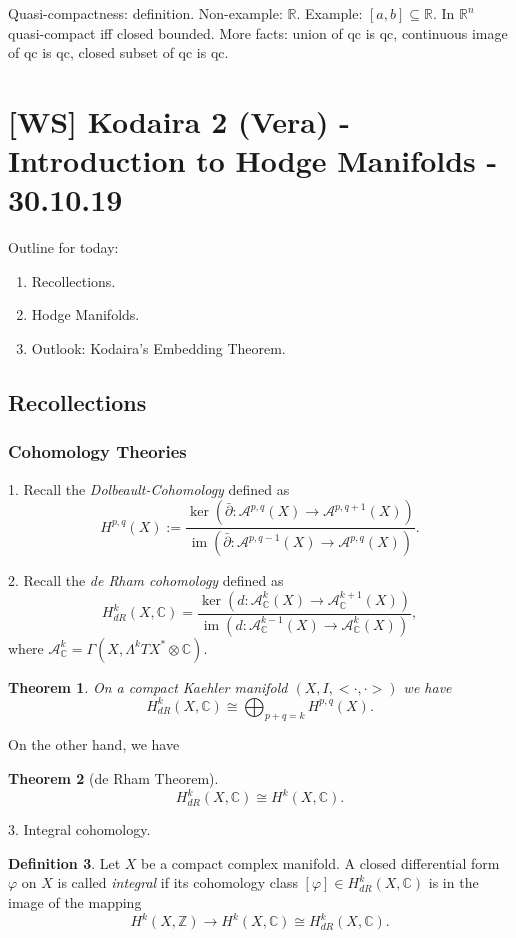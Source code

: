 \documentclass[11pt,A4]{article}
\theoremstyle{plain}
\newtheorem{thm}{Theorem}[section]
\theoremstyle{definition}
\newtheorem{defn}[thm]{Definition}
\theoremstyle{remark}
\newcommand{\Z}{\mathbb{Z}}
\newcommand{\R}{\mathbb{R}}
\newcommand{\1}{\mathbbm{1}}
\newcommand{\C}{\mathbb{C}}
\newcommand{\A}{\mathscr{A}}
\DeclareMathOperator{\im}{im}
\newcommand{\ot}{\otimes}
\begin{document}
Quasi-compactness: definition.
Non-example: $\R$.
Example: $[a,b]\subseteq \R$.
In $\R^{n}$ quasi-compact iff closed bounded.
More facts: union of qc is qc, continuous image of qc is qc, closed subset of qc is qc.

\section{[WS] Kodaira 2 (Vera) - Introduction to Hodge Manifolds - 30.10.19}

Outline for today:
\begin{enumerate}[label=\arabic*)]
    \item Recollections.
    \item Hodge Manifolds.
    \item Outlook: Kodaira's Embedding Theorem.
\end{enumerate}

\subsection{Recollections}

\subsubsection{Cohomology Theories}

1. Recall the \textit{Dolbeault-Cohomology} defined as
\[ H^{p,q}(X):=\frac{\ker(\bar{\partial}\colon \A^{p,q}(X)\to \A^{p,q+1}(X))}{\im(\bar{\partial}\colon \A^{p,q-1}(X)\to \A^{p,q}(X))}.\]

2. Recall the \textit{de Rham cohomology} defined as
\[ H_{dR}^{k}(X,\C)=\frac{\ker(d\colon \A_{\C}^{k}(X)\to \A_{\C}^{k+1}(X))}{\im(d\colon \A_{\C}^{k-1}(X)\to \A_{\C}^{k}(X))}, \]
where $\A_{\C}^{k}=\Gamma(X,\Lambda^{k}TX^{*}\ot \C)$.

\begin{thm}
    On a compact Kaehler manifold $(X,I,<\cdot,\cdot>)$ we have
    \[ H_{dR}^{k}(X,\C)\cong \bigoplus_{p+q=k}H^{p,q}(X).\]
\end{thm}

On the other hand, we have

\begin{thm}[de Rham Theorem]
    \[ H_{dR}^{k}(X,\C)\cong H^{k}(X,\C).\]
\end{thm}

3. Integral cohomology.

\begin{defn}
    Let $X$ be a compact complex manifold.
    A closed differential form $\varphi$ on $X$ is called \textit{integral} if its cohomology class $[\varphi]\in H^{k}_{dR}(X,\C)$ is in the image of the mapping
    \[ H^{k}(X,\Z)\to H^{k}(X,\C)\cong H_{dR}^{k}(X,\C). \]
\end{defn}
\end{document}
